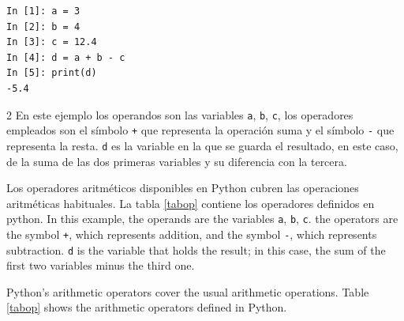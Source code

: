 \begin{center}
    \begin{minipage}{.4\textwidth}
\begin{verbatim}
In [1]: a = 3
In [2]: b = 4
In [3]: c = 12.4
In [4]: d = a + b - c
In [5]: print(d)
-5.4    
\end{verbatim}        
    \end{minipage}
\end{center}

\begin{paracol}{2}
En este ejemplo los operandos son las variables \texttt{a}, \texttt{b}, \texttt{c}, los operadores empleados son el símbolo \texttt{+} que representa la operación suma y el símbolo \texttt{-}  que representa la resta. \texttt{d} es la variable en la que se guarda el resultado, en este caso, de la suma de las dos primeras variables y su diferencia con la tercera.

Los operadores aritméticos disponibles en Python cubren las operaciones aritméticas habituales. La tabla \ref{tabop} contiene los operadores definidos en  python.
\switchcolumn
In this example, the operands are the variables  \texttt{a}, \texttt{b}, \texttt{c}.  the operators are the symbol \texttt{+}, which represents addition, and the symbol \texttt{-}, which represents subtraction. \texttt{d} is the variable that holds the result; in this case, the sum of the first two variables minus the third one.

Python's arithmetic operators cover the usual arithmetic operations. Table \ref{tabop} shows the arithmetic operators defined in Python.
\end{paracol}


